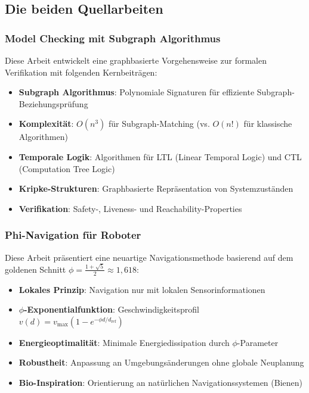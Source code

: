 ﻿\documentclass[a4paper,12pt]{article}
\theoremstyle{definition}
\begin{document}
\subsection{Die beiden Quellarbeiten}

\subsubsection{Model Checking mit Subgraph Algorithmus}

Diese Arbeit entwickelt eine graphbasierte Vorgehensweise zur formalen Verifikation mit folgenden Kernbeiträgen:

\begin{itemize}
	\item \textbf{Subgraph Algorithmus}: Polynomiale Signaturen für effiziente Subgraph-Bezie\-hungsprüfung
	\item \textbf{Komplexität}: $O(n^3)$ für Subgraph-Matching (vs. $O(n!)$ für klassische Algorithmen)
	\item \textbf{Temporale Logik}: Algorithmen für LTL (Linear Temporal Logic) und CTL (Computation Tree Logic)
	\item \textbf{Kripke-Strukturen}: Graphbasierte Repräsentation von Systemzuständen
	\item \textbf{Verifikation}: Safety-, Liveness- und Reachability-Properties
\end{itemize}

\subsubsection{Phi-Navigation für Roboter}

Diese Arbeit präsentiert eine neuartige Navigationsmethode basierend auf dem goldenen Schnitt $\phi = \frac{1+\sqrt{5}}{2} \approx 1{,}618$:

\begin{itemize}
	\item \textbf{Lokales Prinzip}: Navigation nur mit lokalen Sensorinformationen
	\item \textbf{$\phi$-Exponentialfunktion}: Geschwindigkeitsprofil $v(d) = v_{\max}(1 - e^{-\phi d/d_{\text{ref}}})$
	\item \textbf{Energieoptimalität}: Minimale Energiedissipation durch $\phi$-Parameter
	\item \textbf{Robustheit}: Anpassung an Umgebungsänderungen ohne globale Neuplanung
	\item \textbf{Bio-Inspiration}: Orientierung an natürlichen Navigationssystemen (Bienen)
\end{itemize}
\end{document}
